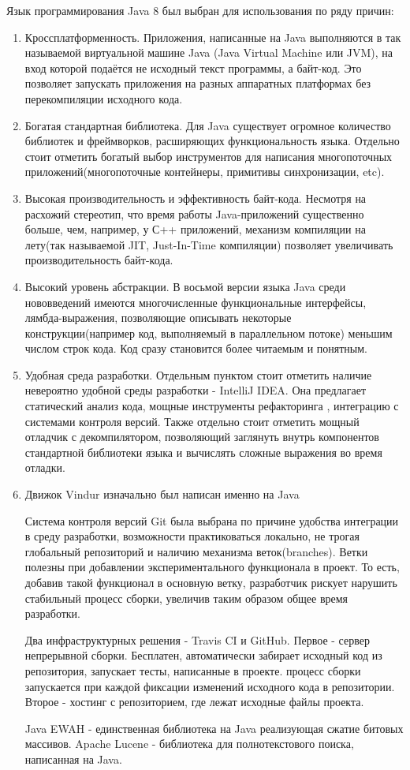 \documentclass{matmex-diploma}
\begin{document}
        Язык программирования Java 8 был выбран для использования по ряду причин:
        \begin{enumerate}
            \item Кроссплатформенность. Приложения, написанные на Java выполняются в так называемой виртуальной машине Java (Java Virtual Machine или JVM), на вход которой подаётся не исходный текст программы, а байт-код. Это позволяет запускать приложения на разных аппаратных платформах без перекомпиляции исходного кода.
            \item Богатая стандартная библиотека. Для Java существует огромное количество библиотек и фреймворков, расширяющих функциональность языка. Отдельно стоит отметить богатый выбор инструментов для написания многопоточных приложений(многопоточные контейнеры, примитивы синхронизации, etc).   
            \item Высокая производительность и эффективность байт-кода. Несмотря на расхожий стереотип, что время работы Java-приложений существенно больше, чем, например, у С++ приложений, механизм компиляции на лету(так называемой JIT, Just-In-Time компиляции) позволяет увеличивать производительность байт-кода.
            \item Высокий уровень абстракции. В восьмой версии языка Java среди нововведений имеются многочисленные функциональные интерфейсы, лямбда-выражения, позволяющие описывать некоторые конструкции(например код, выполняемый в параллельном потоке) меньшим числом строк кода. Код сразу становится более читаемым и понятным.  
            \item Удобная среда разработки. Отдельным пунктом стоит отметить наличие невероятно удобной среды разработки - IntelliJ IDEA. Она предлагает статический анализ кода, мощные инструменты рефакторинга , интеграцию с системами контроля версий. Также отдельно стоит отметить мощный отладчик с декомпилятором, позволяющий заглянуть внутрь компонентов стандартной библиотеки языка и вычислять сложные выражения во время отладки.
            \item Движок Vindur изначально был написан именно на Java
            
        Система контроля версий Git была выбрана по причине удобства интеграции в среду разработки, возможности практиковаться локально, не трогая глобальный репозиторий и наличию механизма веток(branches). Ветки полезны при добавлении экспериментального функционала в проект. То есть, добавив такой функционал в основную ветку, разработчик рискует нарушить стабильный процесс сборки, увеличив таким образом общее время разработки.
        
        Два инфраструктурных решения - Travis CI и GitHub. Первое - сервер непрерывной сборки. Бесплатен, автоматически забирает исходный код из репозитория, запускает тесты, написанные в проекте. процесс сборки запускается при каждой фиксации изменений исходного кода в репозитории. Второе - хостинг с репозиторием, где лежат исходные файлы проекта.
        
        Java EWAH - единственная библиотека на Java реализующая сжатие битовых массивов. Apache Lucene - библиотека для полнотекстового поиска, написанная на Java.
        \end{enumerate}
\end{document}
